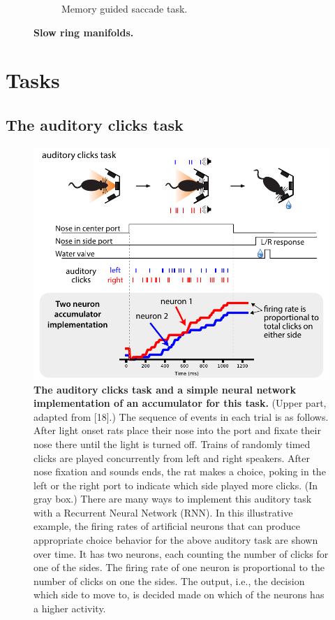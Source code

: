 \documentclass{article}
\newcounter{ct}
\theoremstyle{definition}
\theoremstyle{remark}
\begin{document}
\begin{figure}[htbp]
\begin{subfigure}[b]{0.45\textwidth}
        \caption{Memory guided saccade task.}
    \label{fig:slowcenterout}
    \end{subfigure}
    \caption{\textbf{Slow ring manifolds.}}
    \label{fig:slowmanifolds}
\end{figure}

\newpage
\section{Tasks}
\subsection{The auditory clicks task}
\begin{figure}[H]
    \centering
    \includegraphics{figures/task_pi_v1.pdf}
    \caption{\textbf{The auditory clicks task and a simple neural network implementation of an accumulator for this task.}
    (Upper part, adapted from [18].) %
    The sequence of events in each trial is as follows. 
    After light onset rats place their nose into the port and fixate their nose there until the light is turned off. 
    Trains of randomly timed clicks are played concurrently from left and right speakers.
    After nose fixation and sounds ends, the rat makes a choice, poking in the left or the right port to indicate which side played more clicks.
    (In gray box.) There are many ways to implement this auditory task with a Recurrent Neural Network (RNN). In this illustrative example, the firing rates of artificial neurons that can produce appropriate choice behavior for the above auditory task are shown over time. It has two neurons, each counting the number of clicks for one of the sides. The firing rate of one neuron is proportional to the number of clicks on one the sides. The output, i.e., the decision which side to move to, is decided made on which of the neurons has a higher activity.  }%
    \label{fig:task_pi_v1}
\end{figure}
\end{document}
